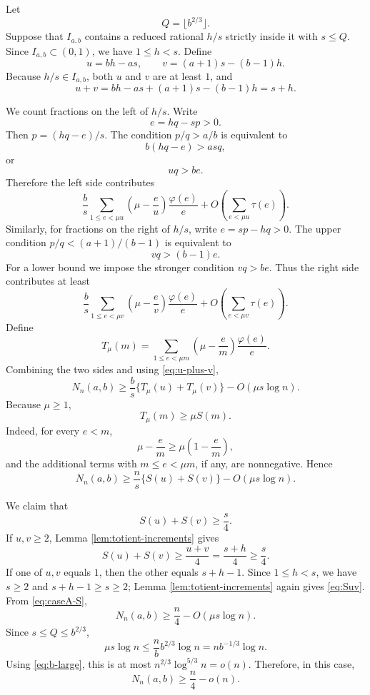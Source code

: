 \documentclass[11pt]{article}
\numberwithin{equation}{section}
\theoremstyle{definition}
\theoremstyle{remark}
\newcommand{\1}{\mathbf 1}
\begin{document}
Let
\[
  Q=\lfloor b^{2/3}\rfloor.
\]
Suppose that $I_{a,b}$ contains a reduced rational $h/s$ strictly inside it with $s\le Q$.  Since $I_{a,b}\subset(0,1)$, we have $1\le h<s$.  Define
\[
  u=bh-as,
  \qquad
  v=(a+1)s-(b-1)h.
\]
Because $h/s\in I_{a,b}$, both $u$ and $v$ are at least $1$, and
\begin{equation}\label{eq:u-plus-v}
  u+v=bh-as+(a+1)s-(b-1)h=s+h.
\end{equation}

We count fractions on the left of $h/s$.  Write
\[
  e=hq-sp>0.
\]
Then $p=(hq-e)/s$.  The condition $p/q>a/b$ is equivalent to
\[
  b(hq-e)>asq,
\]
or
\[
  uq>be.
\]
Therefore the left side contributes
\[
  \frac bs\sum_{1\le e<\mu u}\left(\mu-\frac eu\right)\frac{\varphi(e)}e
  +O\left(\sum_{e<\mu u}\tau(e)\right).
\]
Similarly, for fractions on the right of $h/s$, write $e=sp-hq>0$.  The upper condition $p/q<(a+1)/(b-1)$ is equivalent to
\[
  vq>(b-1)e.
\]
For a lower bound we impose the stronger condition $vq>be$.  Thus the right side contributes at least
\[
  \frac bs\sum_{1\le e<\mu v}\left(\mu-\frac ev\right)\frac{\varphi(e)}e
  +O\left(\sum_{e<\mu v}\tau(e)\right).
\]
Define
\[
  T_\mu(m)=\sum_{1\le e<\mu m}\left(\mu-\frac em\right)\frac{\varphi(e)}e.
\]
Combining the two sides and using \eqref{eq:u-plus-v},
\begin{equation}\label{eq:caseA-combine}
  N_n(a,b)\ge \frac bs\{T_\mu(u)+T_\mu(v)\}-O(\mu s\log n).
\end{equation}
Because $\mu\ge1$,
\[
  T_\mu(m)\ge \mu S(m).
\]
Indeed, for every $e<m$,
\[
  \mu-\frac em\ge \mu\left(1-\frac em\right),
\]
and the additional terms with $m\le e<\mu m$, if any, are nonnegative.  Hence
\begin{equation}\label{eq:caseA-S}
  N_n(a,b)\ge \frac ns\{S(u)+S(v)\}-O(\mu s\log n).
\end{equation}

We claim that
\begin{equation}\label{eq:Suv}
  S(u)+S(v)\ge \frac s4.
\end{equation}
If $u,v\ge2$, Lemma \ref{lem:totient-increments} gives
\[
  S(u)+S(v)\ge\frac{u+v}{4}=\frac{s+h}{4}\ge\frac s4.
\]
If one of $u,v$ equals $1$, then the other equals $s+h-1$.  Since $1\le h<s$, we have $s\ge2$ and $s+h-1\ge s\ge2$; Lemma \ref{lem:totient-increments} again gives \eqref{eq:Suv}.  From \eqref{eq:caseA-S},
\[
  N_n(a,b)\ge \frac n4-O(\mu s\log n).
\]
Since $s\le Q\le b^{2/3}$,
\[
  \mu s\log n\le \frac nb b^{2/3}\log n=n b^{-1/3}\log n.
\]
Using \eqref{eq:b-large}, this is at most $n^{2/3}\log^{5/3}n=o(n)$.  Therefore, in this case,
\[
  N_n(a,b)\ge \frac n4-o(n).
\]
\end{document}
